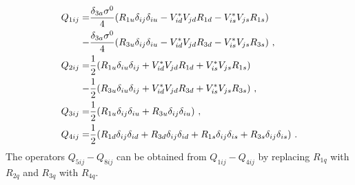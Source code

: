 \begin{align}\label{eq:dependenciesoperators}
	Q_{1ij} =&\frac{\delta_{3a}\sigma^0}{4}(R_{1u}\delta_{ij}\delta_{iu} - V_{id}^*V_{jd}R_{1d} - V_{is}^*V_{js}R_{1s})\notag \\
	-&\frac{\delta_{3a}\sigma^0}{4} (R_{3u}\delta_{ij}\delta_{iu} - V_{id}^*V_{jd}R_{3d} - V_{is}^*V_{js}R_{3s}) \ , \notag \\
	Q_{2ij} =&\frac{1}{2}(R_{1u}\delta_{iu}\delta_{ij}+ V_{id}^*V_{jd}R_{1d}+ V_{is}^*V_{js}R_{1s})\notag \\
	-&\frac{1}{2}(R_{3u}\delta_{iu}\delta_{ij} + V_{id}^*V_{jd}R_{3d} + V_{is}^*V_{js}R_{3s}) \ , \notag \\
	Q_{3ij} =&\frac{1}{2}(R_{1u}\delta_{ij}\delta_{iu} + R_{3u}\delta_{ij}\delta_{iu}) \ , \notag \\
	Q_{4ij} =&\frac{1}{2}(R_{1d}\delta_{ij}\delta_{id} + R_{3d}\delta_{ij}\delta_{id} + R_{1s}\delta_{ij}\delta_{is} + R_{3s}\delta_{ij}\delta_{is}) \ .
\end{align}
The operators $Q_{5ij}-Q_{8ij}$ can be obtained from $Q_{1ij}-Q_{4ij}$ by replacing $R_{1q}$ with $R_{2q}$ and $R_{3q}$ with $R_{4q}$.


